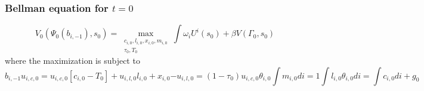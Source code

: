 \documentclass{beamer}
\begin{document}
\begin{frame}
\frametitle{Bellman equation for $t=0$}

 \begin{equation*}
V_0\left(\Psi_0(b_{i,-1}), s_0\right) = \max_{\substack{c_{i,0},l_{i,0},x_{i,0},m_{i,0}\\ \tau_0,T_0}} {\int \omega_i U^i(s_0) + \beta V\left(\Gamma_0, s_0\right)}
\end{equation*}
where the maximization is subject to
\begin{subequations}
\begin{equation*}
\label{eq-imp}
b_{i,-1}u_{i,c,0} = u_{i,c,0}[c_{i,0}-T_0]+u_{i,l,0}l_{i,0}+x_{i,0}
\end{equation*}



\begin{equation*}
\label{eq-wages}
-u_{i,l,0}=(1-\tau_0) u_{i,c,0} \theta_{i,0}
\end{equation*}


\begin{equation*}
\label{eq-norm-m}
\int m_{i,0} di=1
\end{equation*}

\begin{equation*}
\label{eq-resources}
\int l_{i,0} \theta_{i,0} di = \int c_{i,0} di+g_0
\end{equation*}
\end{subequations}

\hyperlink{ramsey-problem}{}
\end{frame}

 
\end{document}
